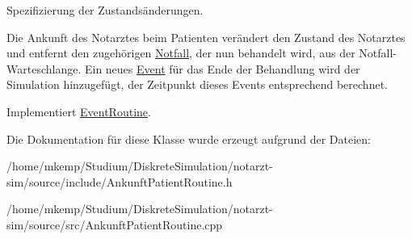 Spezifizierung der Zustandsänderungen. 

Die Ankunft des Notarztes beim Patienten verändert den Zustand des Notarztes und entfernt den zugehörigen \hyperlink{classNotfall}{Notfall}, der nun behandelt wird, aus der Notfall-\/\+Warteschlange. Ein neues \hyperlink{classEvent}{Event} für das Ende der Behandlung wird der Simulation hinzugefügt, der Zeitpunkt dieses Events entsprechend berechnet. 

Implementiert \hyperlink{classEventRoutine_aede9b0fdb576a4a262ced2d7d6548c14}{Event\+Routine}.



Die Dokumentation für diese Klasse wurde erzeugt aufgrund der Dateien\+:\begin{DoxyCompactItemize}
\item 
/home/mkemp/\+Studium/\+Diskrete\+Simulation/notarzt-\/sim/source/include/Ankunft\+Patient\+Routine.\+h\item 
/home/mkemp/\+Studium/\+Diskrete\+Simulation/notarzt-\/sim/source/src/Ankunft\+Patient\+Routine.\+cpp\end{DoxyCompactItemize}
